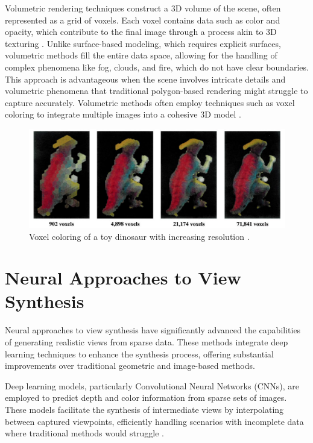 Volumetric rendering techniques construct a 3D volume of the scene, often represented as a grid of voxels.
Each voxel contains data such as color and opacity, which contribute to the final image through a process akin to 3D texturing .
Unlike surface-based modeling, which requires explicit surfaces, volumetric methods fill the entire data space, allowing for the handling of complex phenomena like fog, clouds, and fire, which do not have clear boundaries.
This approach is advantageous when the scene involves intricate details and volumetric phenomena that traditional polygon-based rendering might struggle to capture accurately. Volumetric methods often employ techniques such as voxel coloring to integrate multiple images into a cohesive 3D model \cite{curless_volumetric_1996,seitz_photorealistic_1999}.

\begin{figure}[h!]
  \centering
	\includegraphics[width=\textwidth]{figures/background-volumetric.png}
	\caption{Voxel coloring of a toy dinosaur with increasing resolution \cite{seitz_photorealistic_1999}.}
  \label{fig:background-volumetric}
\end{figure}


\section{Neural Approaches to View Synthesis}
Neural approaches to view synthesis have significantly advanced the capabilities of generating realistic views from sparse data.
These methods integrate deep learning techniques to enhance the synthesis process, offering substantial improvements over traditional geometric and image-based methods.

Deep learning models, particularly Convolutional Neural Networks (CNNs), are employed to predict depth and color information from sparse sets of images.
These models facilitate the synthesis of intermediate views by interpolating between captured viewpoints, efficiently handling scenarios with incomplete data where traditional methods would struggle \cite{kalantari_learning-based_2016,peter_hedman_deep_2019}.

